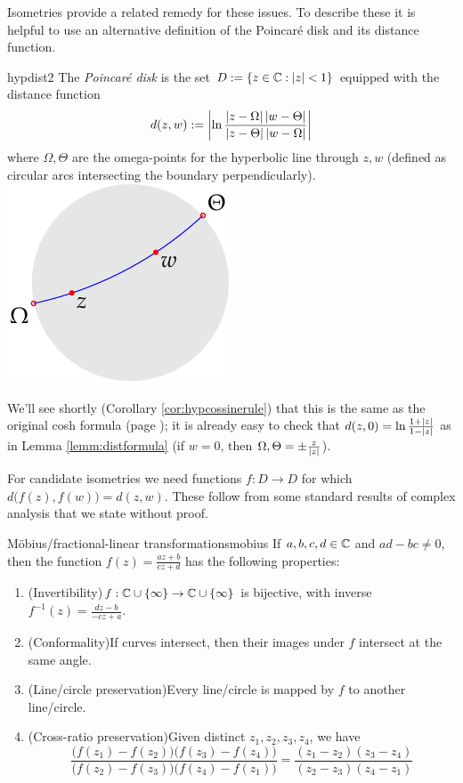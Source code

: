 Isometries provide a related remedy for these issues. To describe these it is helpful to use an alternative definition of the Poincaré disk and its distance function.

\begin{defn}[lower separated=false, sidebyside, sidebyside align=top seam, sidebyside gap=0pt, righthand width=0.3\linewidth]{}{hypdist2}
	The \emph{Poincaré disk} is the set $D:=\{z\in\mathbb{C}:\left| z\right|<1\}$ equipped with the distance function
	\[
		d(z,w):=\left| \ln\frac{\left| z-\Omega\right|\left| w-\Theta\right|}{\left| z-\Theta\right|\left| w-\Omega\right|}\right|
	\]
	where $\Omega,\Theta$ are the omega-points for the hyperbolic line through $z,w$ (defined as circular arcs intersecting the boundary perpendicularly).
	\tcblower
	\flushright\includegraphics[scale=0.95]{isom-dist}
\end{defn}

We'll see shortly (Corollary \ref{cor:hypcossinerule}) that this is the same as the original cosh formula (page \pageref{lemm:distformula}); it is already easy to check that $d(z,0)=\ln\frac{1+\left| z\right|}{1-\left| z\right|}$ as in Lemma \ref{lemm:distformula} (if $w=0$, then $\Omega,\Theta=\pm\frac z{\left| z\right|}$).\par
For candidate isometries we need functions $f:D\to D$ for which $d\bigl(f(z),f(w)\bigr)=d(z,w)$. These follow from some standard results of complex analysis that we state without proof.


\begin{thm}{Möbius/fractional-linear transformations}{mobius}
	If $a,b,c,d\in\mathbb{C}$ and $ad-bc\neq 0$, then the function $f(z)=\tfrac{az+b}{cz+d}$ has the following properties:
	\begin{enumerate}
	  \item (Invertibility)\lstsp $f:\mathbb{C}\cup\{\infty\}\to \mathbb{C}\cup\{\infty\}$ is bijective, with inverse $f^{-1}(z)=\tfrac{dz-b}{-cz+a}$.
	  \item (Conformality)\lstsp If curves intersect, then their images under $f$ intersect at the same angle.
	  \item (Line/circle preservation)\lstsp Every line/circle\footnotemark{} is mapped by $f$ to another line/circle.
	  \item(Cross-ratio preservation)\lstsp Given distinct $z_1,z_2,z_3,z_4$, we have
		\[
			\frac{\big(f(z_1)-f(z_2)\big)\big(f(z_3)-f(z_4)\big)}{\big(f(z_2)-f(z_3)\big)\big(f(z_4)-f(z_1)\big)} =\frac{(z_1-z_2)(z_3-z_4)}{(z_2-z_3)(z_4-z_1)}
		\]
	\end{enumerate}
\end{thm}


